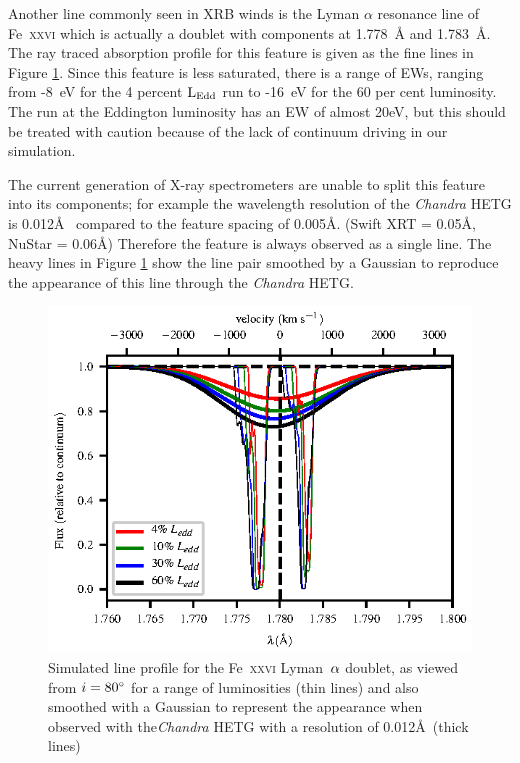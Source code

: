\documentclass[a4paper,fleqn,usenatbib]{mnras}
\begin{document}
Another line commonly seen in XRB winds is the Lyman $\alpha$ resonance 
line of Fe~\textsc{xxvi} which is actually a doublet with components at
1.778~{\AA} and 1.783~{\AA}. The ray traced absorption profile for this 
feature is given as the fine lines in Figure \ref{figure:line26_smooth}. Since this feature is less
saturated, there is a range of EWs, ranging from -8~eV for the 4 percent $\rm{L_{Edd}}$
run to -16~eV for the 60 per cent luminosity. The run at the Eddington luminosity 
has an EW of almost 20eV, but this should be treated with caution because of the lack
of continuum driving in our simulation.

The current generation of X-ray spectrometers are unable to split this feature
into its components; for example the wavelength resolution of the \emph{Chandra}
HETG is 0.012\AA~ compared to the feature spacing of 0.005\AA. (Swift XRT = 0.05\AA,
NuStar = 0.06\AA)
 Therefore the feature is always observed as a single line. The heavy lines in Figure 
 \ref{figure:line26_smooth}
show the line pair smoothed by a Gaussian to reproduce the appearance of this line
through the \emph{Chandra} HETG. 


\begin{figure}
\includegraphics[width=\columnwidth]{figures/80_degrees_fe26_smooth.eps}
\caption{Simulated line profile for the Fe~\textsc{xxvi} Lyman~$\rm{\alpha}$
doublet, as viewed from $i = 80\degree$ for a range
of luminosities (thin lines) and also smoothed with a Gaussian to represent the appearance when
observed with the\emph{Chandra} HETG with a resolution of 0.012\AA~(thick lines)}
\label{figure:line26_smooth}
\end{figure}
\end{document}
